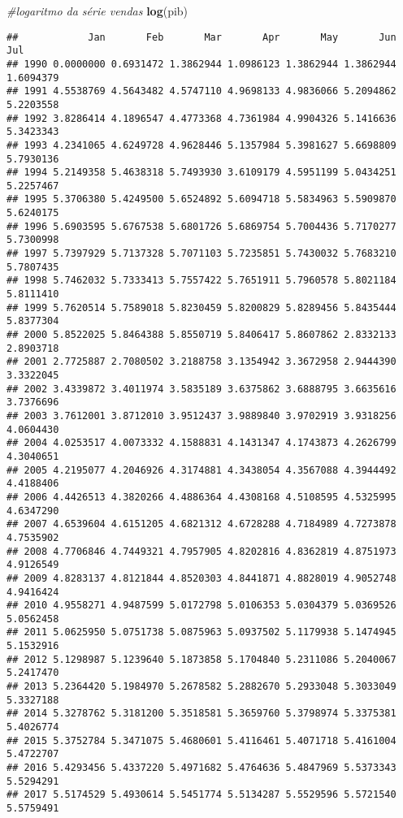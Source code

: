 \documentclass[]{article}
\newenvironment{Shaded}{\begin{snugshade}}{\end{snugshade}}
\newcommand{\CommentTok}[1]{\textcolor[rgb]{0.56,0.35,0.01}{\textit{#1}}}
\newcommand{\KeywordTok}[1]{\textcolor[rgb]{0.13,0.29,0.53}{\textbf{#1}}}
\newcommand{\NormalTok}[1]{#1}
\begin{document}
\begin{Shaded}
\begin{Highlighting}[]
\CommentTok{#logaritmo da série vendas}
\KeywordTok{log}\NormalTok{(pib)}
\end{Highlighting}
\end{Shaded}

\begin{verbatim}
##            Jan       Feb       Mar       Apr       May       Jun       Jul
## 1990 0.0000000 0.6931472 1.3862944 1.0986123 1.3862944 1.3862944 1.6094379
## 1991 4.5538769 4.5643482 4.5747110 4.9698133 4.9836066 5.2094862 5.2203558
## 1992 3.8286414 4.1896547 4.4773368 4.7361984 4.9904326 5.1416636 5.3423343
## 1993 4.2341065 4.6249728 4.9628446 5.1357984 5.3981627 5.6698809 5.7930136
## 1994 5.2149358 5.4638318 5.7493930 3.6109179 4.5951199 5.0434251 5.2257467
## 1995 5.3706380 5.4249500 5.6524892 5.6094718 5.5834963 5.5909870 5.6240175
## 1996 5.6903595 5.6767538 5.6801726 5.6869754 5.7004436 5.7170277 5.7300998
## 1997 5.7397929 5.7137328 5.7071103 5.7235851 5.7430032 5.7683210 5.7807435
## 1998 5.7462032 5.7333413 5.7557422 5.7651911 5.7960578 5.8021184 5.8111410
## 1999 5.7620514 5.7589018 5.8230459 5.8200829 5.8289456 5.8435444 5.8377304
## 2000 5.8522025 5.8464388 5.8550719 5.8406417 5.8607862 2.8332133 2.8903718
## 2001 2.7725887 2.7080502 3.2188758 3.1354942 3.3672958 2.9444390 3.3322045
## 2002 3.4339872 3.4011974 3.5835189 3.6375862 3.6888795 3.6635616 3.7376696
## 2003 3.7612001 3.8712010 3.9512437 3.9889840 3.9702919 3.9318256 4.0604430
## 2004 4.0253517 4.0073332 4.1588831 4.1431347 4.1743873 4.2626799 4.3040651
## 2005 4.2195077 4.2046926 4.3174881 4.3438054 4.3567088 4.3944492 4.4188406
## 2006 4.4426513 4.3820266 4.4886364 4.4308168 4.5108595 4.5325995 4.6347290
## 2007 4.6539604 4.6151205 4.6821312 4.6728288 4.7184989 4.7273878 4.7535902
## 2008 4.7706846 4.7449321 4.7957905 4.8202816 4.8362819 4.8751973 4.9126549
## 2009 4.8283137 4.8121844 4.8520303 4.8441871 4.8828019 4.9052748 4.9416424
## 2010 4.9558271 4.9487599 5.0172798 5.0106353 5.0304379 5.0369526 5.0562458
## 2011 5.0625950 5.0751738 5.0875963 5.0937502 5.1179938 5.1474945 5.1532916
## 2012 5.1298987 5.1239640 5.1873858 5.1704840 5.2311086 5.2040067 5.2417470
## 2013 5.2364420 5.1984970 5.2678582 5.2882670 5.2933048 5.3033049 5.3327188
## 2014 5.3278762 5.3181200 5.3518581 5.3659760 5.3798974 5.3375381 5.4026774
## 2015 5.3752784 5.3471075 5.4680601 5.4116461 5.4071718 5.4161004 5.4722707
## 2016 5.4293456 5.4337220 5.4971682 5.4764636 5.4847969 5.5373343 5.5294291
## 2017 5.5174529 5.4930614 5.5451774 5.5134287 5.5529596 5.5721540 5.5759491

\end{verbatim}
\end{document}
